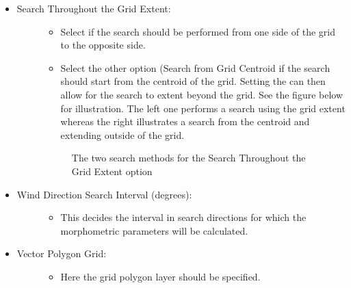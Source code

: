 \documentclass[letterpaper,10pt,english]{sphinxmanual}
\begin{document}
\begin{itemize}
\item {} \begin{description}
\item[{Search Throughout the Grid Extent:}] \leavevmode\begin{itemize}
\item {} 
Select if the search should be performed from one side of the grid to the opposite side.

\item {} 
Select the other option (Search from Grid Centroid if the search should start from the centroid of the grid. Setting the  can then allow for the search to extent beyond the grid. See the figure below for illustration. The left one performs a search using the grid extent whereas the right illustrates a search from the centroid and extending outside of the grid.

\end{itemize}

\begin{figure}[htbp]
\centering
\capstart

\noindent{}
\caption{The two search methods for the Search Throughout the Grid Extent option}\label{\detokenize{pre-processor/Urban Morphology Morphometric Calculator (Grid):id2}}\end{figure}

\end{description}

\item {} \begin{description}
\item[{Wind Direction Search Interval (degrees):}] \leavevmode\begin{itemize}
\item {} 
This decides the interval in search directions for which the morphometric parameters will be calculated.

\end{itemize}

\end{description}

\item {} \begin{description}
\item[{Vector Polygon Grid:}] \leavevmode\begin{itemize}
\item {} 
Here the grid polygon layer should be specified.


\end{itemize}
\end{description}
\end{itemize}
\end{document}
